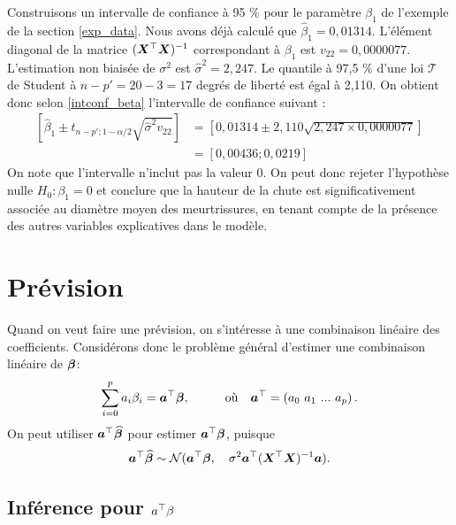 \begin{exemple}
Construisons un intervalle de confiance à 95 $\%$ pour le paramètre $\beta_1$ de l'exemple de la section \ref{exp_data}. Nous avons déjà calculé que $\widehat\beta_1=0,01314$. L'élément diagonal de la matrice $(\bm{X}^\top\bm{X})^{-1}$ correspondant à $\beta_1$ est $v_{22}=0,0000077$. L'estimation non biaisée de $\sigma^2$ est $\widehat\sigma^2=2,247$. Le quantile à 97,5 $\%$ d'une loi $\mathcal{T}$ de Student à $n-p'=20-3=17$ degrés de liberté est égal à 2,110.  On obtient donc selon \eqref{intconf_beta} l'intervalle de confiance suivant :
\begin{align*}
\left[ \widehat\beta_1\pm t_{n-p'; 1-\alpha/2}\sqrt{\widehat\sigma^2 v_{22}} \right] &=\left[0,01314\pm2,110\sqrt{2,247\times 0,0000077}\right]\\
&=[0,00436;0,0219]
\end{align*}
On note que l'intervalle n'inclut pas la valeur 0. On peut donc rejeter l'hypothèse nulle $H_0: \beta_1=0$  et conclure que la hauteur de la chute est significativement associée au diamètre moyen des meurtrissures, en tenant compte de la présence des autres variables explicatives dans le modèle.
\end{exemple}


\section{Prévision}
\label{sec:PrévisionRLM}


Quand on veut faire une prévision, on s'intéresse à une combinaison linéaire des coefficients. Considérons donc le problème général d'estimer une combinaison linéaire de $\bm\beta$:
\begin{equation}
\sum_{i=0}^p a_i \beta_i = \bo a^\top\bobeta,
	\hspace{1cm} \mbox{o\`u} \quad \bo a^\top=\left(a_0\ a_1 \ ... \ a_p\right).
\label{eq:abeta}
\end{equation}
On peut utiliser ${\bm{a}}^\top\widehat{\bm\beta}$ pour estimer ${\bm{a}}^\top\bm\beta$, puisque
\begin{equation}
{\bm{a}}^\top\widehat{\bm\beta} \sim \mathcal{N}({\bm{a}}^\top\bm\beta, \quad \sigma^2{\bm{a}}^\top(\bm{X}^\top\bm{X})^{-1}{\bm{a}}).
\label{eq:distabeta}
\end{equation}


\subsection{Inférence pour  $a^\top\beta$ }
\label{sec:TestsDHypothèsetheta}


